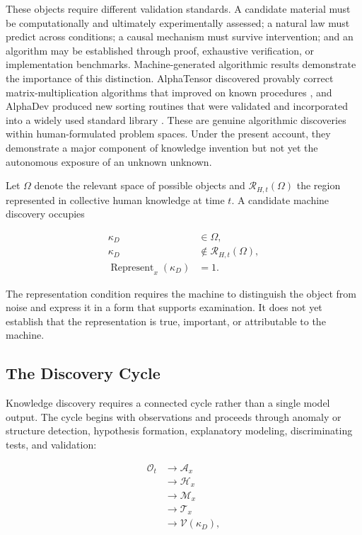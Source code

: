 These objects require different validation standards. A candidate material
must be computationally and ultimately experimentally assessed; a natural law
must predict across conditions; a causal mechanism must survive intervention;
and an algorithm may be established through proof, exhaustive verification, or
implementation benchmarks. Machine-generated algorithmic results demonstrate
the importance of this distinction. AlphaTensor discovered provably correct
matrix-multiplication algorithms that improved on known procedures
\cite{fawzi2022alphatensor}, and AlphaDev produced new sorting routines that
were validated and incorporated into a widely used standard library
\cite{mankowitz2023alphadev}. These are genuine algorithmic discoveries within
human-formulated problem spaces. Under the present account, they demonstrate a
major component of knowledge invention but not yet the autonomous exposure of
an unknown unknown.

Let $\Omega$ denote the relevant space of possible objects and
$\mathcal{R}_{H,t}(\Omega)$ the region represented in collective human
knowledge at time $t$. A candidate machine discovery occupies

\begin{equation}
\begin{aligned}
\kappa_D &\in \Omega,\\
\kappa_D &\notin \mathcal{R}_{H,t}(\Omega),\\
\operatorname{Represent}_{x}(\kappa_D)
&=1.
\end{aligned}
\label{eq:discovery_object}
\end{equation}

The representation condition requires the machine to distinguish the object
from noise and express it in a form that supports examination. It does not yet
establish that the representation is true, important, or attributable to the
machine.

\subsection{\textbf{The Discovery Cycle}}

Knowledge discovery requires a connected cycle rather than a single model
output. The cycle begins with observations and proceeds through anomaly or
structure detection, hypothesis formation, explanatory modeling, discriminating
tests, and validation:

\begin{equation}
\begin{aligned}
\mathcal{O}_{t}
&\longrightarrow \mathcal{A}_{x}\\
&\longrightarrow \mathcal{H}_{x}\\
&\longrightarrow \mathcal{M}_{x}\\
&\longrightarrow \mathcal{T}_{x}\\
&\longrightarrow \mathcal{V}(\kappa_D),
\end{aligned}
\label{eq:discovery_cycle}
\end{equation}


